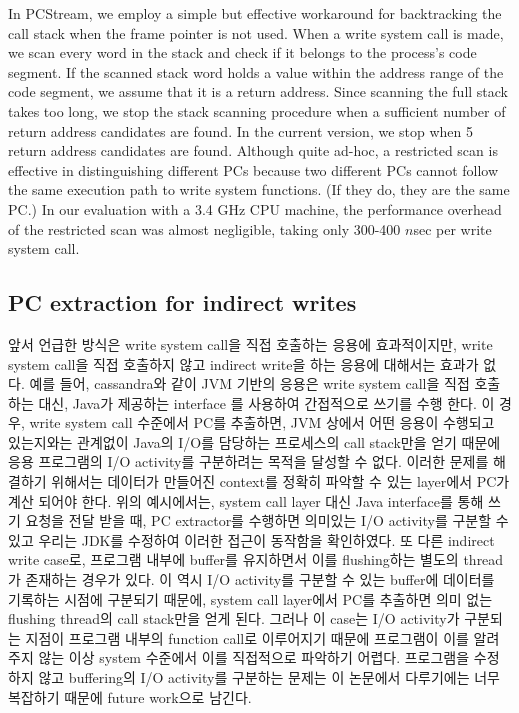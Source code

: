 In \textsf{\small PCStream}, we employ a simple but effective workaround 
for backtracking the call stack when the frame pointer is not used.
When a write system call is made, we scan every word in the stack and check
if it belongs to the process's code segment.  If the scanned stack word holds a
value within the address range of the code segment, we assume that it is a
return address.  Since scanning the full stack takes too long, we stop the
stack scanning procedure when a sufficient number of return address candidates
are found.  In the current version, we stop when 5 return address candidates
are found.  Although quite ad-hoc, a restricted scan is effective in
distinguishing different PCs because two different PCs
cannot follow the same execution path to write system functions.  
(If they do, they are the same PC.) In our evaluation
with a 3.4 GHz CPU machine, the performance overhead of the restricted scan was
almost negligible, taking only 300-400 $n$sec per write system call.

\subsection{PC extraction for indirect writes}
{\color{blue}
앞서 언급한 방식은 write system call을 직접 호출하는 응용에 효과적이지만,
write system call을 직접 호출하지 않고 indirect write을 하는 응용에 대해서는 효과가 없다.
예를 들어, cassandra와 같이 JVM 기반의 응용은 write system call을 직접 호출하는 대신, Java가 제공하는 interface
를 사용하여 간접적으로 쓰기를 수행 한다.
이 경우, write system call 수준에서 PC를 추출하면, JVM 상에서 어떤 응용이 수행되고 있는지와는 관계없이 Java의
I/O를 담당하는 프로세스의 call stack만을 얻기 때문에 응용 프로그램의 I/O activity를 구분하려는 목적을 달성할 수 없다.
이러한 문제를 해결하기 위해서는 데이터가 만들어진 context를 정확히 파악할 수 있는 layer에서 PC가 계산 되어야 한다.
위의 예시에서는, system call layer 대신 Java interface를 통해 쓰기 요청을 전달 받을 때, PC extractor를 수행하면 의미있는
I/O activity를 구분할 수 있고 우리는 JDK를 수정하여 이러한 접근이 동작함을 확인하였다.
또 다른 indirect write case로, 프로그램 내부에 buffer를 유지하면서 이를 flushing하는 별도의 thread가 존재하는 경우가 있다.
이 역시 I/O activity를 구분할 수 있는 buffer에 데이터를 기록하는 시점에 구분되기 때문에, system call layer에서 PC를 추출하면 
의미 없는 flushing thread의 call stack만을 얻게 된다. 
그러나 이 case는 I/O activity가 구분되는 지점이 프로그램 내부의 function call로 이루어지기 때문에 프로그램이 이를 
알려주지 않는 이상 system 수준에서 이를 직접적으로 파악하기 어렵다. 
프로그램을 수정하지 않고 buffering의 I/O activity를 구분하는 문제는 이 논문에서 다루기에는
너무 복잡하기 때문에 future work으로 남긴다.
}

